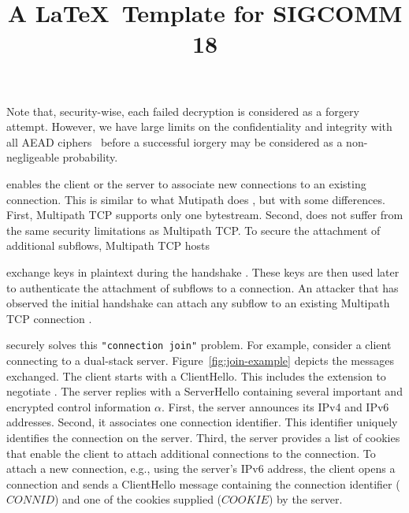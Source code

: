 Note that, security-wise, each failed decryption is considered as a
forgery attempt. However, we have large limits on the confidentiality and
integrity with all AEAD ciphers~\cite{luykx2015limits, aeadlimits} before a
successful iorgery may be considered as a non-negligeable probability.


\tcpls enables the client
or the server to associate new \tcp connections to an existing \tcpls
connection. This is similar to what Mutipath \tcp does \cite{raiciu2012hard,rfc6824},
but with some differences. First, Multipath TCP supports only one bytestream.
Second, \tcpls does not suffer from the same security limitations as Multipath
TCP. To secure the attachment of additional subflows, Multipath TCP hosts
\title{A \LaTeX\ Template for SIGCOMM 18}
exchange keys in plaintext during the handshake \cite{rfc6824, rfc8684}.
These keys are
then used later to authenticate the attachment of subflows to a connection. An
attacker that has observed the initial handshake can attach any subflow to an
existing Multipath TCP connection \cite{rfc6181}.

\tcpls securely solves this \texttt{"connection join"} problem. For example, consider a
client connecting to a dual-stack server. Figure~\ref{fig:join-example} depicts
the \tls messages exchanged.  The client starts with a ClientHello. This includes
the \tcpls extension to negotiate \tcpls. The server replies with a ServerHello
containing several important and encrypted control information $\alpha$. First, the server announces
its IPv4 and IPv6 addresses. Second, it associates one connection identifier.
This identifier uniquely identifies the connection on the server. Third, the
server provides a list of cookies that enable the client to attach additional
\tcp connections to the \tcpls connection. To attach a new connection, e.g., using
the server's IPv6 address, the client opens a \tcp connection and sends a
ClientHello message containing the connection identifier ($CONNID$) and one of the cookies
supplied ($COOKIE$) by the server.

